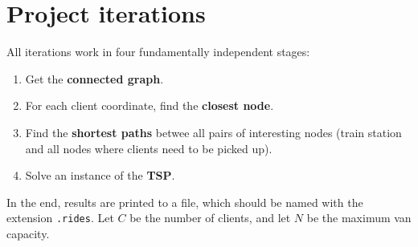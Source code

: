 \chapter{Project iterations} \label{iterations}

All iterations work in four fundamentally independent stages:
\begin{enumerate}
    \item Get the \textbf{connected graph}.
    \item For each client coordinate, find the \textbf{closest node}.
    \item \label{itm:iterations-3} Find the \textbf{shortest paths} betwee all pairs of interesting nodes (train station and all nodes where clients need to be picked up).
    \item Solve an instance of the \textbf{\acrlong*{TSP}}.
\end{enumerate}

In the end, results are printed to a file, which should be named with the extension \texttt{.rides}.
Let $C$ be the number of clients, and let $N$ be the maximum van capacity.

